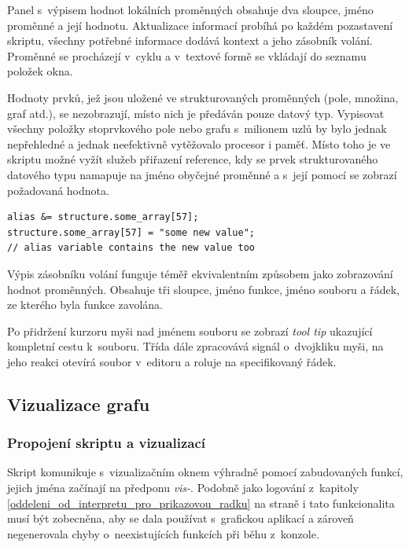\documentclass[11pt,twoside,a4paper]{book}
\begin{document}
Panel s~výpisem hodnot lokálních proměnných obsahuje dva sloupce, jméno proměnné a její hodnotu. Aktualizace informací probíhá po každém pozastavení skriptu, všechny potřebné informace dodává kontext a jeho zásobník volání. Proměnné se procházejí v~cyklu a v~textové formě se vkládají do seznamu položek okna.

Hodnoty prvků, jež jsou uložené ve strukturovaných proměnných (pole, množina, graf atd.), se nezobrazují, místo nich je předáván pouze datový typ. Vypisovat všechny položky stoprvkového pole nebo grafu s~milionem uzlů by bylo jednak nepřehledné a jednak neefektivně vytěžovalo procesor i paměť. Místo toho je ve skriptu možné vyžít služeb přiřazení reference, kdy se prvek strukturovaného datového typu namapuje na jméno obyčejné proměnné a s~její pomocí se zobrazí požadovaná hodnota.

\begin{verbatim}
alias &= structure.some_array[57];
structure.some_array[57] = "some new value";
// alias variable contains the new value too
\end{verbatim}

Výpis zásobníku volání funguje téměř ekvivalentním způsobem jako zobrazování hodnot proměnných. Obsahuje tři sloupce, jméno funkce, jméno souboru a řádek, ze kterého byla funkce zavolána.

Po přidržení kurzoru myši nad jménem souboru se zobrazí \textit{tool tip} ukazující kompletní cestu k~souboru. Třída dále zpracovává signál o~dvojkliku myši, na jeho reakci otevírá soubor v~editoru a roluje na specifikovaný řádek.


\subsection{Vizualizace grafu}

\subsubsection{Propojení skriptu a vizualizací}

Skript komunikuje s~vizualizačním oknem výhradně pomocí zabudovaných funkcí, jejich jména začínají na předponu \textit{vis-}. Podobně jako logování z~kapitoly \ref{oddeleni_od_interpretu_pro_prikazovou_radku} na straně \pageref{oddeleni_od_interpretu_pro_prikazovou_radku} i tato funkcionalita musí být zobecněna, aby se dala používat s~grafickou aplikací a zároveň negenerovala chyby o~neexistujících funkcích při běhu z~konzole.
\end{document}
